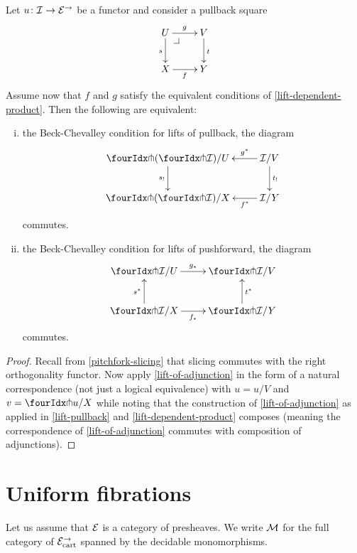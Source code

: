 \documentclass[reqno,10pt,a4paper,oneside]{amsart}
\begin{document}
\begin{proposition}
\label{lift-pushforward-BC} Let $u \co \cal{I} \to \catE^{\to}$ be a functor and consider a 
pullback square
\[
\xymatrix{
  U
  \ar[d]_{s}
  \ar[r]^{g}
  \pullback{dr}
&
  V
  \ar[d]^{t}
\\
  X
  \ar[r]_{f}
&
  Y
}
\]
Assume now that $f$ and $g$ satisfy the equivalent conditions of \cref{lift-dependent-product}.
Then the following are equivalent:
\begin{enumerate}[(i)]
\item the Beck-Chevalley condition for lifts of pullback, \ie the diagram
\[
\xymatrix{
  \liftl{(\liftr{\cal{I}})}/U
  \ar[d]_{s_!}
&
  \cal{I}/V
  \ar[l]_-{g^*}
  \ar[d]^{t_!}
\\
  \liftl{(\liftr{\cal{I}})}/X
&
  \cal{I}/Y
  \ar[l]^-{f^*}
}
\]
commutes. 
\item the Beck-Chevalley  condition for lifts of pushforward, \ie the diagram
\[
\xymatrix{
  \liftr{\cal{I}}/U
  \ar[r]^{g_*}
&
  \liftr{\cal{I}}/V
\\
  \liftr{\cal{I}}/X
  \ar[r]_{f_*}
  \ar[u]^{s^*}
&
  \liftr{\cal{I}}/Y
  \ar[u]_{t^*}
}
\]
commutes.
\end{enumerate}
\end{proposition}

\begin{proof}
Recall from \cref{pitchfork-slicing} that slicing commutes with the right orthogonality functor.
Now apply \cref{lift-of-adjunction} in the form of a natural correspondence (not just a logical equivalence) with $u = u/V$ and $v = \liftr{u}/X$ while noting that the construction of \cref{lift-of-adjunction} as applied in \cref{lift-pullback} and \cref{lift-dependent-product} composes (meaning the correspondence of \cref{lift-of-adjunction} commutes with composition of adjunctions).
\end{proof}




\section{Uniform  fibrations}
\label{sec:uniform-kan-fibrations}

 
Let us assume that $\cal{E}$ is a category of presheaves.
We write $\cal{M}$ for the full category of $\cal{E}^\to_\cart$ spanned
by the decidable monomorphisms. 
\end{document}
